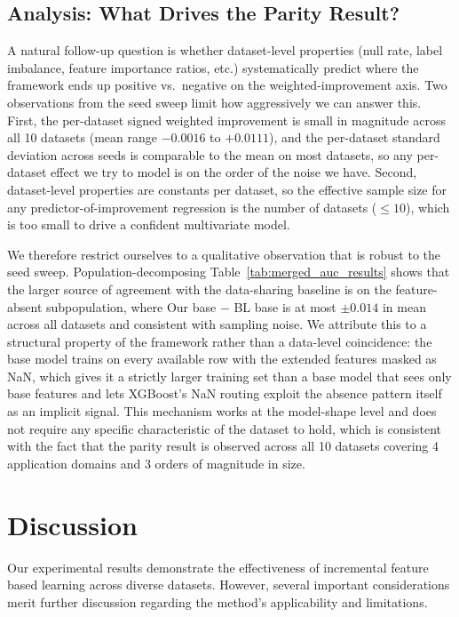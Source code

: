 \documentclass[sigconf]{acmart}
\begin{document}
\begin{itemize}
\subsection{Analysis: What Drives the Parity Result?}

A natural follow-up question is whether dataset-level properties (null rate, label imbalance, feature importance ratios, etc.) systematically predict where the framework ends up positive vs.\ negative on the weighted-improvement axis. Two observations from the seed sweep limit how aggressively we can answer this. First, the per-dataset signed weighted improvement is small in magnitude across all 10 datasets (mean range $-0.0016$ to $+0.0111$), and the per-dataset standard deviation across seeds is comparable to the mean on most datasets, so any per-dataset effect we try to model is on the order of the noise we have. Second, dataset-level properties are constants per dataset, so the effective sample size for any predictor-of-improvement regression is the number of datasets ($\le 10$), which is too small to drive a confident multivariate model.

We therefore restrict ourselves to a qualitative observation that is robust to the seed sweep. Population-decomposing Table~\ref{tab:merged_auc_results} shows that the larger source of agreement with the data-sharing baseline is on the feature-absent subpopulation, where Our base $-$ BL base is at most $\pm 0.014$ in mean across all datasets and consistent with sampling noise. We attribute this to a structural property of the framework rather than a data-level coincidence: the base model trains on every available row with the extended features masked as NaN, which gives it a strictly larger training set than a base model that sees only base features and lets XGBoost's NaN routing exploit the absence pattern itself as an implicit signal. This mechanism works at the model-shape level and does not require any specific characteristic of the dataset to hold, which is consistent with the fact that the parity result is observed across all 10 datasets covering 4 application domains and 3 orders of magnitude in size.

\section{Discussion}

Our experimental results demonstrate the effectiveness of incremental feature based learning across diverse datasets. However, several important considerations merit further discussion regarding the method's applicability and limitations.


\end{itemize}
\end{document}
